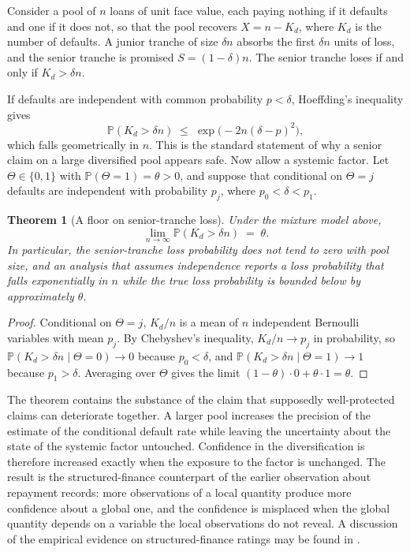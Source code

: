 \documentclass[11pt]{article}
\newtheorem{theorem}{Theorem}[section]
\theoremstyle{definition}
\theoremstyle{remark}
\newcommand{\Prob}{\mathbb{P}}
\begin{document}
Consider a pool of $n$ loans of unit face value, each paying nothing if it defaults and one if it does not, so that the pool recovers $X=n-K_d$, where $K_d$ is the number of defaults. A junior tranche of size $\delta n$ absorbs the first $\delta n$ units of loss, and the senior tranche is promised $S=(1-\delta)n$. The senior tranche loses if and only if $K_d>\delta n$.

If defaults are independent with common probability $p<\delta$, Hoeffding's inequality \cite{hoeffding1963} gives
\[
\Prob(K_d>\delta n)\;\le\;\exp\!\big(-2n(\delta-p)^2\big),
\]
which falls geometrically in $n$. This is the standard statement of why a senior claim on a large diversified pool appears safe. Now allow a systemic factor. Let $\Theta\in\{0,1\}$ with $\Prob(\Theta=1)=\theta>0$, and suppose that conditional on $\Theta=j$ defaults are independent with probability $p_j$, where $p_0<\delta<p_1$.

\begin{theorem}[A floor on senior-tranche loss]\label{thm:floor}
Under the mixture model above,
\[
\lim_{n\to\infty}\Prob(K_d>\delta n)\;=\;\theta .
\]
In particular, the senior-tranche loss probability does not tend to zero with pool size, and an analysis that assumes independence reports a loss probability that falls exponentially in $n$ while the true loss probability is bounded below by approximately $\theta$.
\end{theorem}

\begin{proof}
Conditional on $\Theta=j$, $K_d/n$ is a mean of $n$ independent Bernoulli variables with mean $p_j$. By Chebyshev's inequality, $K_d/n\to p_j$ in probability, so $\Prob(K_d>\delta n\mid\Theta=0)\to 0$ because $p_0<\delta$, and $\Prob(K_d>\delta n\mid\Theta=1)\to 1$ because $p_1>\delta$. Averaging over $\Theta$ gives the limit $(1-\theta)\cdot 0+\theta\cdot 1=\theta$.
\end{proof}

The theorem contains the substance of the claim that supposedly well-protected claims can deteriorate together. A larger pool increases the precision of the estimate of the conditional default rate while leaving the uncertainty about the state of the systemic factor untouched. Confidence in the diversification is therefore increased exactly when the exposure to the factor is unchanged. The result is the structured-finance counterpart of the earlier observation about repayment records: more observations of a local quantity produce more confidence about a global one, and the confidence is misplaced when the global quantity depends on a variable the local observations do not reveal. A discussion of the empirical evidence on structured-finance ratings may be found in \cite{coval2009}.
\end{document}
